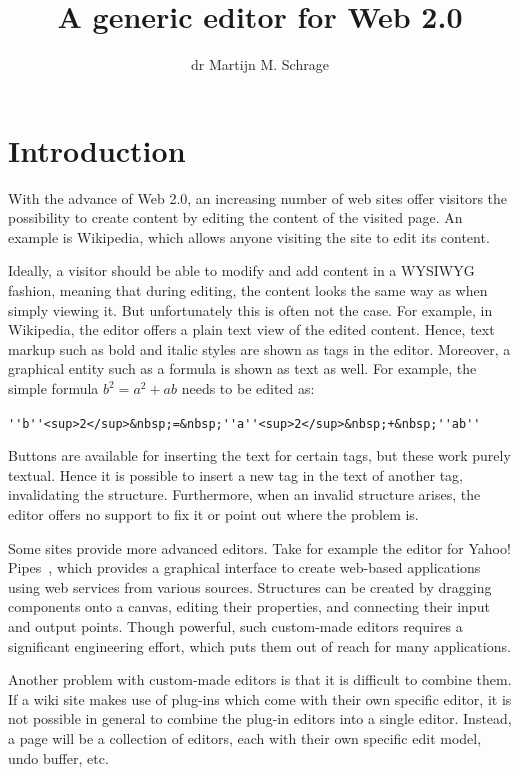 \documentclass[10pt]{article}
\title{A generic editor for Web 2.0}
\author{dr Martijn M. Schrage}
\date{\version}
\begin{document}
\maketitle

\section{Introduction}


With the advance of Web 2.0, an increasing number of web sites offer visitors the possibility to create content by editing the content of the visited page. An example is Wikipedia, which allows anyone visiting the site to edit its content. 

Ideally, a visitor should be able to modify and add content in a WYSIWYG fashion, meaning that during editing, the content looks the same way as when simply viewing it. But unfortunately this is often not the case. For example, in Wikipedia, the editor offers a plain text view of the edited content. Hence, text markup such as bold and italic styles are shown as tags in the editor. Moreover, a graphical entity such as a formula is shown as text as well. For example, the simple formula $b^2 = a^2 + ab$ needs to be edited as:
 
\verb|''b''<sup>2</sup>&nbsp;=&nbsp;''a''<sup>2</sup>&nbsp;+&nbsp;''ab''|

Buttons are available for inserting the text for certain tags, but these work purely textual. Hence it is possible to insert a new tag in the text of another tag, invalidating the structure. Furthermore, when an invalid structure arises, the editor offers no support to fix it or point out where the problem is. 


Some sites provide more advanced editors. Take for example the editor for Yahoo! Pipes~\cite{yahoo08pipes}, which provides a graphical interface to create web-based applications using web services from various sources. Structures can be created by dragging components onto a canvas, editing their properties, and connecting their input and output points. Though powerful, such custom-made editors requires a significant engineering effort, which puts them out of reach for many applications.

Another problem with custom-made editors is that it is difficult to combine them. If a wiki site makes use of plug-ins which come with their own specific editor, it is not possible in general to combine the plug-in editors into a single editor. Instead, a page will be a collection of editors, each with their own specific edit model, undo buffer, etc.
\end{document}
